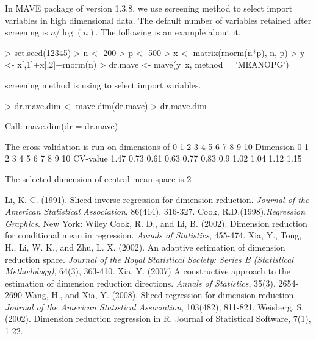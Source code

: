 \documentclass{article}
\begin{document}
In MAVE package of version 1.3.8, we use screening method to select import variables in high dimensional data. The default number of variables retained after screening is $n/\log(n)$. The following is an example about it.
\begin{Schunk}
\begin{Sinput}
> set.seed(12345)
> n <- 200
> p <- 500
> x <- matrix(rnorm(n*p), n, p)
> y <- x[,1]+x[,2]+rnorm(n)
> dr.mave <- mave(y~x, method = 'MEANOPG')
\end{Sinput}
\begin{Soutput}
screening method is using to select import variables.
\end{Soutput}
\begin{Sinput}
> dr.mave.dim <- mave.dim(dr.mave)
> dr.mave.dim
\end{Sinput}
\begin{Soutput}
Call:
mave.dim(dr = dr.mave)

The cross-validation is run on dimensions of 0 1 2 3 4 5 6 7 8 9 10 
Dimension	0 	1 	2 	3 	4 	5 	6 	7 	8 	9 	10 	
CV-value	1.47 	0.73 	0.61 	0.63 	0.77 	0.83 	0.9 	1.02 	1.04 	1.12 	1.15 	

The selected dimension of  central mean space  is  2
\end{Soutput}
\end{Schunk}
\begin{thebibliography}{9}
Li, K. C. (1991). Sliced inverse regression for dimension reduction. \textit{Journal of the American Statistical Association}, 86(414), 316-327.
Cook, R.D.(1998),\textit{Regression Graphics}. New York: Wiley
Cook, R. D., and Li, B. (2002). Dimension reduction for conditional mean in regression. \textit{Annals of Statistics}, 455-474.
  Xia, Y., Tong, H., Li, W. K., and Zhu, L. X. (2002). An adaptive estimation of dimension reduction space. \textit{Journal of the Royal Statistical Society: Series B (Statistical Methodology)}, 64(3), 363-410.
Xia, Y. (2007) A constructive approach to the estimation of dimension reduction directions.  \textit{Annals of Statistics}, 35(3), 2654-2690
 Wang, H., and Xia, Y. (2008). Sliced regression for dimension reduction. \textit{Journal of the American Statistical Association}, 103(482), 811-821.
Weisberg, S. (2002). Dimension reduction regression in R. Journal of Statistical Software, 7(1), 1-22.
\end{thebibliography}
\end{document}
